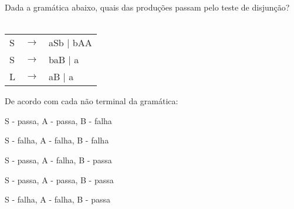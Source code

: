 \question[10]
Dada a gramática abaixo, quais das produções passam pelo teste de disjunção?\\
\\
\begin{tabular}{|l c l}
	S & $\rightarrow$ & aSb | bAA \\
    S & $\rightarrow$ & b{aB} | a \\
	L & $\rightarrow$ & aB | a \\
\end{tabular}

De acordo com cada não terminal da gramática:
\begin{choices}
\item S - passa, A - passa, B - falha %
\item S - falha, A - falha, B - falha
\item S - passa, A - falha, B - passa
\item S - passa, A - passa, B - passa
\item S - falha, A - falha, B - passa
\end{choices}
\answerline

